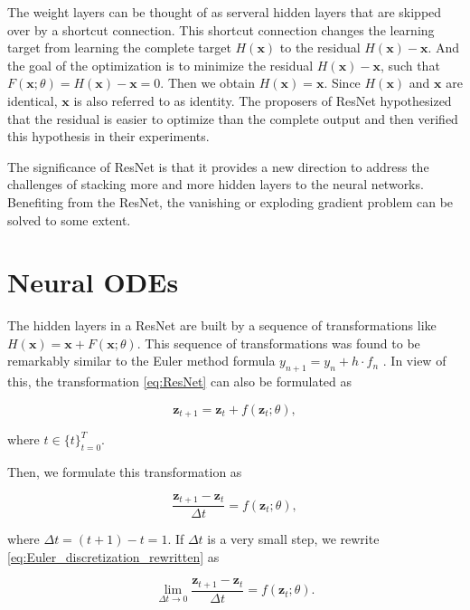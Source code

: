 \documentclass[
	parskip, 			   %
	twoside, 			   %
	DIV=14, 			   %
	BCOR=15.0mm, 		   %
	headsepline, 		   %
	open=right, 		   %
	captions=tableheading, %
	bibliography=totoc,    %
	numbers=noenddot       %
]{scrreprt}
\begin{document}
The weight layers can be thought of as serveral hidden layers that are skipped over by a shortcut connection. This shortcut connection changes the learning target from learning the complete target $H(\mathbf{x})$ to the residual $H(\mathbf{x})-\mathbf{x}$. And the goal of the optimization is to minimize the residual $H(\mathbf{x})-\mathbf{x}$, such that $F(\mathbf{x};\theta)=H(\mathbf{x})-\mathbf{x}=0$. Then we obtain $H(\mathbf{x})=\mathbf{x}$. Since $H(\mathbf{x})$ and $\mathbf{x}$ are identical, $\mathbf{x}$ is also referred to as identity. The proposers of ResNet hypothesized that the residual is easier to optimize than the complete output and then verified this hypothesis in their experiments. 

 The significance of ResNet is that it provides a new direction to address the challenges of stacking more and more hidden layers to the neural networks. Benefiting from the ResNet, the vanishing or exploding gradient problem can be solved to some extent.

\section{Neural ODEs}
The hidden layers in a ResNet are built by a sequence of transformations like $H(\mathbf{x})=\mathbf{x}+F(\mathbf{x};\theta)$. This sequence of transformations was found to be remarkably similar to the Euler method formula $y_{n+1} = y_{n} + h \cdot f_{n}$ \cite{ruthotto2020deep}. In view of this, the transformation \ref{eq:ResNet} can also be formulated as

\begin{equation}
    \label{eq:Euler_discretization}
    \mathbf{z}_{t+1} = \mathbf{z}_{t} + f(\mathbf{z}_{t}; \theta),
\end{equation}

where $t \in \{t\}_{t=0}^T$.

Then, we formulate this transformation as 

\begin{equation}
    \label{eq:Euler_discretization_rewritten}
    \frac{\mathbf{z}_{t+1}-\mathbf{z}_{t}}{\Delta t} = f(\mathbf{z}_{t}; \theta),
\end{equation}

where $\Delta t = (t+1)-t = 1$. If $\Delta t$ is a very small step, we rewrite \ref{eq:Euler_discretization_rewritten} as

\begin{equation}
    \label{eq:Euler_discretization_small_step}
    \lim_{\Delta t \to 0} \frac{\mathbf{z}_{t+1}-\mathbf{z}_{t}}{\Delta t} = f(\mathbf{z}_{t}; \theta).
\end{equation}
\end{document}
